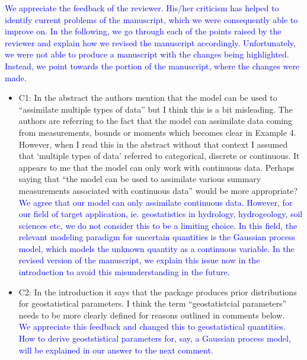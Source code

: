 \documentclass{article}
\begin{document}
\textcolor{blue}{We appreciate the feedback of the reviewer. His/her criticism has helped to identify current problems of the manuscript, which we were consequently able to improve on. In the following, we go through each of the points raised by the reviewer and explain how we revised the manuscript accordingly. Unfortunately, we were not able to produce a manuscript with the changes  being highlighted. Instead, we point towards the portion of the manuscript, where the changes were made.}

\begin{itemize}
    \item C1: In the abstract the authors mention that the model can be used to “assimilate multiple types of data” but I think this is a bit misleading. The authors are referring to the fact that the model can assimilate data coming from measurements, bounds or moments which becomes clear in Example 4. However, when I read this in the abstract without that context I assumed that ‘multiple types of data’ referred to categorical, discrete or continuous. It appears to me that the model can only work with continuous data. Perhaps saying that “the model can be used to assimilate various summary measurements associated with continuous data” would be more appropriate?\\
    \textcolor{blue}{We agree that our model can only assimilate continuous data. However, for our field of target application, ie. geostatistics in hydrology, hydrogeology, soil sciences etc, we do not consider this to be a limiting choice. In this field, the relevant modeling paradigm for uncertain quantities is the Gaussian process model, which models the unknown quantity as a continuous variable.} \textcolor{blue}{In the revised version of the manuscript, we explain this issue now in the introduction to avoid this misunderstanding in the future.}
    
    \item C2: In the introduction it says that the package produces prior distributions for geostatistical parameters. I think the term “geostatistcial parameters” needs to be more clearly defined for reasons outlined in comments below.\\
    \textcolor{blue}{We appreciate this feedback and changed this to geostatistical quantities. How to derive geoststistical parameters for, say, a Gaussian process model, will be explained in our answer to the next comment.}
    

\end{itemize}
\end{document}
